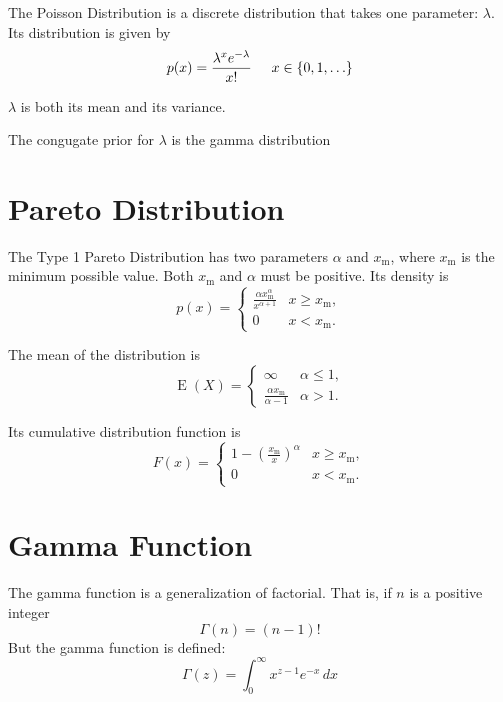 \documentclass[12pt]{article}
\begin{document}
The Poisson Distribution is a discrete distribution that takes one parameter: $\lambda$. Its distribution is given by
\begin{equation*}
p(x) = \frac{\lambda^x  e^{-\lambda}}{x!} \hspace{5mm}  x \in \lbrace 0, 1, \ldots\rbrace
\end{equation*}


$\lambda$ is both its mean and its variance.

The congugate prior for $\lambda$ is the gamma distribution

\section*{Pareto Distribution}

The Type 1 Pareto Distribution has two parameters $\alpha$ and $x_\mathrm{m}$, where $x_\mathrm{m}$ is the minimum possible value.  Both  $x_\mathrm{m}$ and $\alpha$ must be positive. Its density is
\begin{equation*}
p(x)= \begin{cases} \frac{\alpha x_\mathrm{m}^\alpha}{x^{\alpha+1}} & x \ge x_\mathrm{m}, \\ 0 & x < x_\mathrm{m}. \end{cases}
\end{equation*}

The mean of the distribution is
\begin{equation*}
\operatorname{E}(X)= \begin{cases} \infty & \alpha\le 1, \\
\frac{\alpha x_\mathrm{m}}{\alpha-1} & \alpha>1.
\end{cases}
\end{equation*}

Its cumulative distribution function is
\begin{equation*}
F(x) = \begin{cases}
1-\left(\frac{x_\mathrm{m}}{x}\right)^\alpha & x \ge x_\mathrm{m}, \\
0 & x < x_\mathrm{m}.\end{cases}
\end{equation*}

\section*{Gamma Function}

The gamma function is a generalization of factorial. That is, if $n$ is a positive integer
\begin{equation*}
\Gamma(n) = (n-1)!
\end{equation*}
But the gamma function is defined:
\begin{equation*}
\Gamma(z) = \int_0^\infty x^{z-1} e^{-x}\,dx
\end{equation*}
\end{document}
